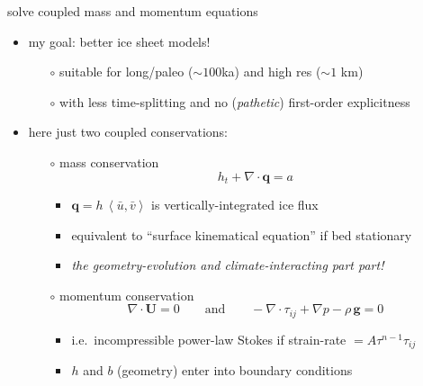 \documentclass{beamer}
\newcommand\bq{\mathbf{q}}
\newcommand\bU{\mathbf{U}}
\newcommand\Div{\nabla\cdot}
\newcommand{\ip}[2]{\ensuremath{\left<#1,#2\right>}}
\begin{document}
\begin{frame}{solve coupled mass and momentum equations}

\begin{itemize}
\item my goal: better ice sheet models!
  \begin{itemize}
  \item[$\circ$]  suitable for long/paleo ($\sim 100$ka) and high res ($\sim 1$ km)
  \item[$\circ$]  with less time-splitting and no (\emph{pathetic}) first-order explicitness
  \end{itemize}
\item here just two coupled conservations:
  \begin{itemize}
  \item[$\circ$]  \alert{mass conservation}
\begin{equation*}
h_t + \Div\bq = a
\end{equation*}
    \begin{itemize}
    \vspace{-5mm}
    \item $\bq = h\, \ip{\bar u}{\bar v}$ is vertically-integrated ice flux
    \item equivalent to ``surface kinematical equation'' if bed stationary
    \item<2> \emph{the geometry-evolution and climate-interacting part part!}
    \end{itemize}
  \item[$\circ$]  \alert{momentum conservation}
\begin{equation*}
  \nabla \cdot \bU = 0 \qquad \text{and} \qquad - \nabla \cdot \tau_{ij} + \nabla p - \rho\, \mathbf{g} = 0
\end{equation*}
    \begin{itemize}
    \vspace{-5mm}
    \item i.e.~incompressible power-law Stokes if strain-rate $= A \tau^{n-1} \tau_{ij}$
    \item $h$ and $b$ (geometry) enter into boundary conditions
    \end{itemize}
  \end{itemize}
\end{itemize}
\end{frame}
\end{document}
